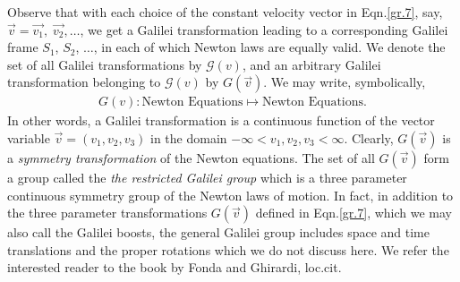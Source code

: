 \soln Observe that with each choice of the constant 
velocity vector in Eqn.\eqref{gr.7}, say, $\vec{v} = 
\vec{v_1}, \; \vec{ v_2}, \dots$, we get a Galilei 
transformation leading to a corresponding Galilei frame 
$S_1$, $S_2$, $\dots$, in each of which Newton laws are 
equally valid.  We denote the set of all Galilei 
transformations by $ {\mathcal{G}(v)} $, and an 
arbitrary Galilei transformation belonging to $ 
{\mathcal{G}(v)} $ by $ G(\vec{v}) $.  We may write, 
symbolically,
\begin{align}\label{9}
G(v): \text{Newton Equations} \mapsto \text{Newton
Equations}.
\end{align}
In other words, a Galilei transformation is a 
continuous function of the vector variable $\vec{v} 
=(v_1,v_2,v_3) $ in the domain $ -\infty< 
v_1,v_2,v_3<\infty $. Clearly, $G(\vec{v})$ is a 
\textsl{symmetry transformation} of the Newton 
equations. The set of all $G(\vec{v})$ form a group 
called the \textsl{the restricted Galilei group} which 
is a three parameter continuous symmetry group of the 
Newton laws of motion. In fact, in addition to the 
three parameter transformations $ G(\vec{v}) $ defined 
in Eqn.\eqref{gr.7}, which we may also call the 
{Galilei boosts}, the general Galilei group includes 
space and time translations and the proper rotations 
which we do not discuss here. We refer the interested 
reader to the book by Fonda and Ghirardi, loc.cit.

